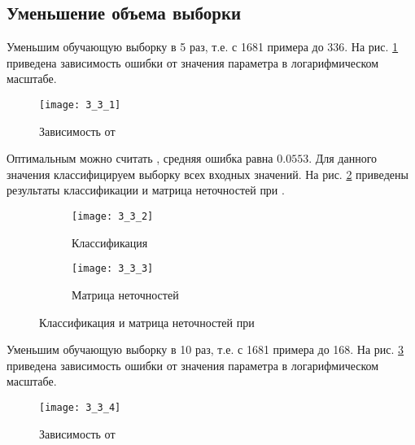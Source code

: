 \subsection{Уменьшение объема выборки}


Уменьшим обучающую выборку в 5 раз, т.е. с 1681 примера до 336. На рис. \ref{fig:3_3_1} приведена зависимость ошибки  от значения параметра  в логарифмическом масштабе. 
\vspace{-0.5cm}
\begin{figure}[H]
\begin{center}
	\texttt{[image: 3\_3\_1]}
	\caption{Зависимость  от }
	\label{fig:3_3_1}
\end{center}
\end{figure}
\vspace{-0.5cm}

Оптимальным можно считать , средняя ошибка равна $0.0553$. Для данного значения классифицируем выборку всех входных значений. На рис. \ref{fig:3_3_2} приведены результаты классификации и матрица неточностей при .
\vspace{-1cm}
\begin{figure}[H]
\begin{center}
	\begin{subfigure}{0.49\textwidth}
		\texttt{[image: 3\_3\_2]}
		\caption{Классификация}
	\end{subfigure}
	\begin{subfigure}{0.47\textwidth}
		\texttt{[image: 3\_3\_3]}
		\caption{Матрица неточностей}
	\end{subfigure}
	\caption{Классификация и матрица неточностей при }
	\label{fig:3_3_2}
\end{center}
\end{figure}

Уменьшим обучающую выборку в 10 раз, т.е. с 1681 примера до 168. На рис. \ref{fig:3_3_4} приведена зависимость ошибки  от значения параметра  в логарифмическом масштабе.
\vspace{-0.5cm} 
\begin{figure}[H]
\begin{center}
	\texttt{[image: 3\_3\_4]}
	\caption{Зависимость  от }
	\label{fig:3_3_4}
\end{center}
\end{figure}
\vspace{-0.5cm}

